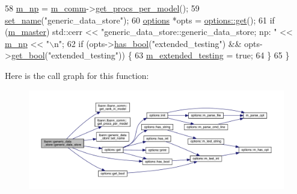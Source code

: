 \begin{DoxyCode}
58   \hyperlink{classlbann_1_1generic__data__store_afcd4f99959c265c8c03dcf8ad3779d85}{m\_np} = \hyperlink{classlbann_1_1generic__data__store_a719b6b99c20f97a6cf25f6029582bf36}{m\_comm}->\hyperlink{classlbann_1_1lbann__comm_a5755dfdfc6377b4cae5ef8f7819e17de}{get\_procs\_per\_model}();
59   \hyperlink{classlbann_1_1generic__data__store_a853741295a07b5687921fc56d0d7d5b2}{set\_name}(\textcolor{stringliteral}{"generic\_data\_store"});
60   \hyperlink{classoptions}{options} *opts = \hyperlink{classoptions_a9ecfe9c365269df68a41b961c31ae3f5}{options::get}();
61   \textcolor{keywordflow}{if} (\hyperlink{classlbann_1_1generic__data__store_a143fd33ef3a53180bc62745e369c16f8}{m\_master}) std::cerr << \textcolor{stringliteral}{"generic\_data\_store::generic\_data\_store; np: "} << 
      \hyperlink{classlbann_1_1generic__data__store_afcd4f99959c265c8c03dcf8ad3779d85}{m\_np} << \textcolor{stringliteral}{"\(\backslash\)n"};
62     \textcolor{keywordflow}{if} (opts->\hyperlink{classoptions_aafb1d2a7ccde0b1bf786230ba4080ecd}{has\_bool}(\textcolor{stringliteral}{"extended\_testing"}) && opts->\hyperlink{classoptions_a99aa190102de33e2aed39723929f9fad}{get\_bool}(\textcolor{stringliteral}{"extended\_testing"})) \{
63       \hyperlink{classlbann_1_1generic__data__store_a5e64702aa4a38c8533fa52944a8473d5}{m\_extended\_testing} = \textcolor{keyword}{true};
64     \}
65 \}
\end{DoxyCode}
Here is the call graph for this function\+:\nopagebreak
\begin{figure}[H]
\begin{center}
\leavevmode
\includegraphics[width=350pt]{classlbann_1_1generic__data__store_acbcd88161c06f4bb9a70bbae857d4ee0_cgraph}
\end{center}
\end{figure}
\mbox{\label{classlbann_1_1generic__data__store_a0198154e411a4952c2536af390551d13}} 
